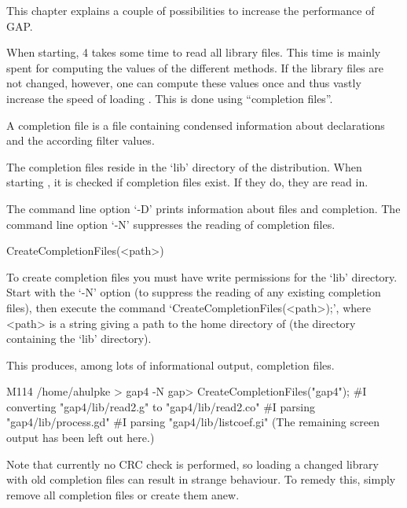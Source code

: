 
This chapter explains a couple of possibilities to increase the performance
of GAP.


When starting, {\GAP}4 takes some time to read all library files. This time
is mainly spent for computing the values of the different methods. If the
library files are not changed, however, one can compute these values once
and thus vastly increase the speed of loading {\GAP}. This is done using
``completion files''.

A completion file is a file containing condensed information about
declarations and the according filter values.

The completion files reside in the `lib' directory of the {\GAP}
distribution. When starting {\GAP}, it is checked if completion files exist.
If they do, they are read in.

The command line option `-D' prints information about files and completion.
The command line option `-N' suppresses the reading of completion files.

\>CreateCompletionFiles(<path>)

To create completion files you must have write permissions for the `lib'
directory. Start {\GAP} with the `-N' option (to suppress
the reading of any existing completion files), then execute the command
`CreateCompletionFiles(<path>);', where <path> is a string giving a path to
the home directory of {\GAP} (the directory containing the `lib' directory).

This produces, among lots of informational output, completion files.

\begintt
M114 /home/ahulpke > gap4 -N
gap> CreateCompletionFiles("gap4");
#I  converting "gap4/lib/read2.g" to "gap4/lib/read2.co"
#I    parsing "gap4/lib/process.gd"
#I    parsing "gap4/lib/listcoef.gi"
\endtt
(The remaining screen output has been left out here.)

Note that currently no CRC check is performed, so loading a changed library
with old completion files can result in strange behaviour. To remedy this,
simply remove all completion files or create them anew.


